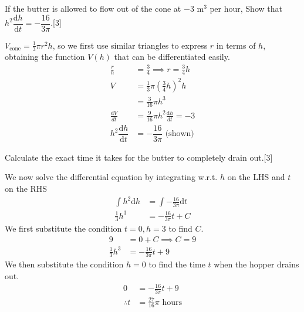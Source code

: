 \documentclass[12pt, a4 paper]{article}
\begin{document}
\begin{outline}[enumerate]
 If the butter is allowed to flow out of the cone at \(- 3\textrm{ m}^3{\textrm{ per hour}}\),
 \2 Show that \({h^2}\dfrac{{{\mathrm{d}}h}}{{{\mathrm{d}}t}} =  - \dfrac{{16}}{{3\pi }}\).\hfill[3]
 \begin{answer}
  \(V_{\textrm{cone}}=\frac{1}{3}\pi r^2 h\), so we first use similar triangles to express \(r\) in terms of \(h\), obtaining the function \(V(h)\) that can be differentiated easily.
  \begin{align*}
   \frac{r}{h}                                   & =\frac{3}{4} \implies r=\frac{3}{4}h               \\
   V                                             & = \frac{1}{3}\pi \left(\frac{3}{4}h\right)^2 h     \\
                                                 & = \frac{3}{16}\pi h^3                              \\
   \frac{\mathrm{d}V}{{d}t}                      & = \frac{9}{16}\pi h^2\frac{\mathrm{d}h}{{d}t} = -3 \\
   {h^2}\dfrac{{{\mathrm{d}}h}}{{{\mathrm{d}}t}} & =  - \dfrac{{16}}{{3\pi }} \textrm{ (shown)}
  \end{align*}
 \end{answer}

 \2 Calculate the exact time it takes for the butter to completely drain out.\hfill[3]
 \begin{answer}
  We now solve the differential equation by integrating w.r.t. \(h\) on the LHS and \(t\) on the RHS
  \begin{align*}
   \int {h^2}\mathrm{d}h & = \int - \frac{16}{3\pi} \mathrm{d}t \\
   \frac{1}{3}h^3        & = -\frac{16}{3\pi}t + C
  \end{align*}
  We first substitute the condition \(t=0,h=3\) to find \(C\).
  \begin{align*}
   9              & = 0 + C \implies C=9    \\
   \frac{1}{3}h^3 & = -\frac{16}{3\pi}t + 9
  \end{align*}
  We then substitute the condition \(h=0\) to find the time \(t\) when the hopper drains out.
  \begin{align*}
   0            & = -\frac{16}{3\pi}t + 9           \\
   \therefore t & =\frac{27}{16}\pi \textrm{ hours}
  \end{align*}
 \end{answer}


\end{outline}
\end{document}
